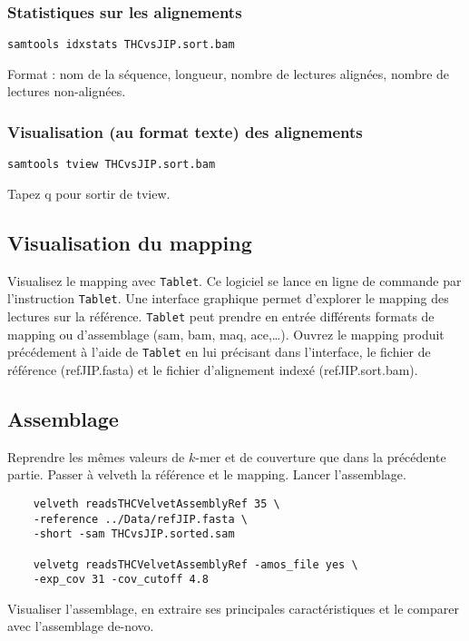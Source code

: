 \documentclass[a4paper,12pt]{article}
\begin{document}
\subsubsection*{Statistiques sur les alignements}
\begin{lstlisting}
samtools idxstats THCvsJIP.sort.bam
\end{lstlisting}
Format : nom de la séquence, longueur, nombre de lectures alignées, nombre de lectures non-alignées.

\subsubsection*{Visualisation (au format texte) des alignements}
\begin{lstlisting}
samtools tview THCvsJIP.sort.bam
\end{lstlisting}
Tapez q pour sortir de tview.



\subsection{Visualisation du mapping}
Visualisez le mapping avec \verb=Tablet=. Ce logiciel se lance en ligne de commande par l'instruction \verb=Tablet=. Une interface graphique permet d'explorer le mapping des lectures sur la référence. \verb=Tablet= peut prendre en entrée différents formats de mapping ou d'assemblage (sam, bam, maq, ace,\ldots). Ouvrez le mapping produit précédement à l'aide de \verb=Tablet= en lui précisant dans l'interface, le fichier de référence (refJIP.fasta) et le fichier d'alignement indexé (refJIP.sort.bam).

\subsection{Assemblage}
Reprendre les mêmes valeurs de $k$-mer et de couverture que dans la précédente partie. Passer à velveth la référence et le mapping. Lancer l'assemblage.

\begin{lstlisting}
	velveth readsTHCVelvetAssemblyRef 35 \
	-reference ../Data/refJIP.fasta \
	-short -sam THCvsJIP.sorted.sam 
	
	velvetg readsTHCVelvetAssemblyRef -amos_file yes \
	-exp_cov 31 -cov_cutoff 4.8
\end{lstlisting}

Visualiser l'assemblage, en extraire ses principales caractéristiques  et le comparer avec l'assemblage de-novo.
\end{document}
